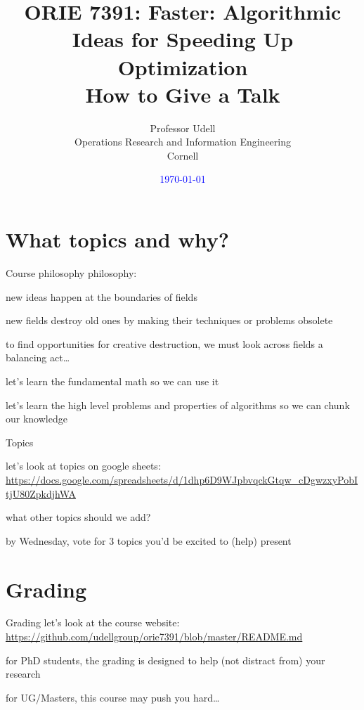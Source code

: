 \documentclass[presentation,xcolor={usenames,dvipsnames}]{beamer}
\title{ORIE 7391: Faster: Algorithmic Ideas for Speeding Up Optimization\\[2ex]
       How to Give a Talk}
\date{\textcolor{blue}{\today}}
\author{Professor Udell \\[1ex]
Operations Research and Information Engineering \\
Cornell}
\begin{document}
\begin{frame}
\titlepage
\end{frame}

\section{What topics and why?}

\begin{frame}{Course philosophy}
philosophy:
\bit
\item new ideas happen at the boundaries of fields
\item new fields destroy old ones by making their techniques or problems obsolete
\item to find opportunities for creative destruction, we must look across fields
\eit
\vfill \pause
a balancing act\ldots
\bit
\item let's learn the fundamental math so we can use it
\item let's learn the high level problems and properties of algorithms so we can chunk our knowledge
\eit

\end{frame}

\begin{frame}{Topics}

let's look at topics on google sheets: \\
\url{https://docs.google.com/spreadsheets/d/1dhp6D9WJpbvqckGtqw_cDgwzxyPobItjU80ZpkdjhWA}

\bit
\item what other topics should we add?
\item by Wednesday, vote for 3 topics you'd be excited to (help) present
\eit

\end{frame}

\section{Grading}

\begin{frame}{Grading}
let's look at the course website: \\
\url{https://github.com/udellgroup/orie7391/blob/master/README.md}
\vfill
\bit
\item for PhD students, the grading is designed to help (not distract from) your research
\item for UG/Masters, this course may push you hard\ldots
\eit
\end{frame}
\end{document}
